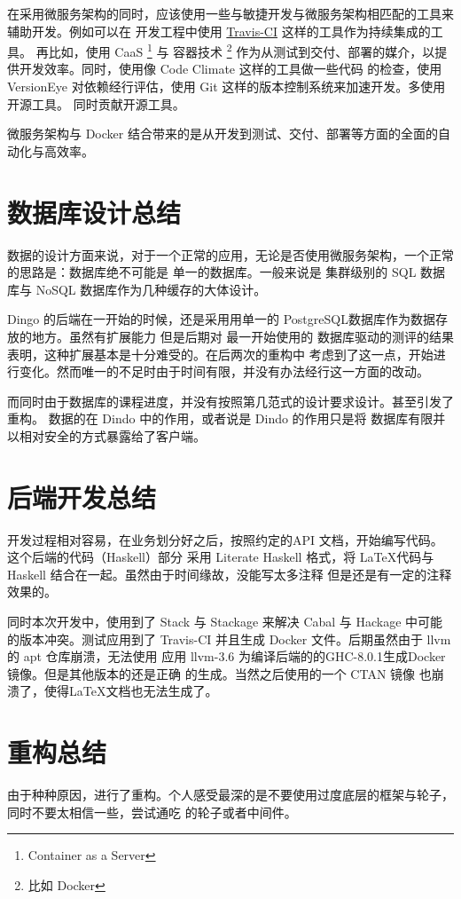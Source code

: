 \documentclass{dingo}
\begin{document}
    在采用微服务架构的同时，应该使用一些与敏捷开发与微服务架构相匹配的工具来辅助开发。例如可以在
    开发工程中使用 \href{http://www.travis-ci.org}{Travis-CI} 这样的工具作为持续集成的工具。
    再比如，使用 CaaS \footnote{Container as a Server} 与 容器技术 \footnote{比如 Docker}
    作为从测试到交付、部署的媒介，以提供开发效率。同时，使用像 Code Climate 这样的工具做一些代码
    的检查，使用 VersionEye 对依赖经行评估，使用 Git 这样的版本控制系统来加速开发。多使用开源工具。
    同时贡献开源工具。
    
    微服务架构与 Docker 结合带来的是从开发到测试、交付、部署等方面的全面的自动化与高效率。
    
    \section{数据库设计总结}
    数据的设计方面来说，对于一个正常的应用，无论是否使用微服务架构，一个正常的思路是：数据库绝不可能是
    单一的数据库。一般来说是 集群级别的 SQL 数据库与 NoSQL 数据库作为几种缓存的大体设计。
    
    Dingo 的后端在一开始的时候，还是采用用单一的 PostgreSQL数据库作为数据存放的地方。虽然有扩展能力
    但是后期对 最一开始使用的 数据库驱动的测评的结果表明，这种扩展基本是十分难受的。在后两次的重构中
    考虑到了这一点，开始进行变化。然而唯一的不足时由于时间有限，并没有办法经行这一方面的改动。
    
    而同时由于数据库的课程进度，并没有按照第几范式的设计要求设计。甚至引发了重构。
    数据的在 Dindo 中的作用，或者说是 Dindo 的作用只是将 数据库有限并以相对安全的方式暴露给了客户端。
    
    \section{后端开发总结}
    开发过程相对容易，在业务划分好之后，按照约定的API 文档，开始编写代码。这个后端的代码（Haskell）部分
    采用 Literate Haskell 格式，将 \LaTeX 代码与 Haskell 结合在一起。虽然由于时间缘故，没能写太多注释
    但是还是有一定的注释效果的。
    
    同时本次开发中，使用到了 Stack 与 Stackage 来解决 Cabal 与 Hackage 中可能的版本冲突。测试应用到了
    Travis-CI 并且生成 Docker 文件。后期虽然由于 llvm 的 apt 仓库崩溃，无法使用  应用 llvm-3.6
    为编译后端的的GHC-8.0.1生成Docker 镜像。但是其他版本的还是正确 的生成。当然之后使用的一个 CTAN 镜像
    也崩溃了，使得\LaTeX 文档也无法生成了。
    
    \section{重构总结}
    由于种种原因，进行了重构。个人感受最深的是不要使用过度底层的框架与轮子，同时不要太相信一些，尝试通吃
    的轮子或者中间件。
\end{document}
